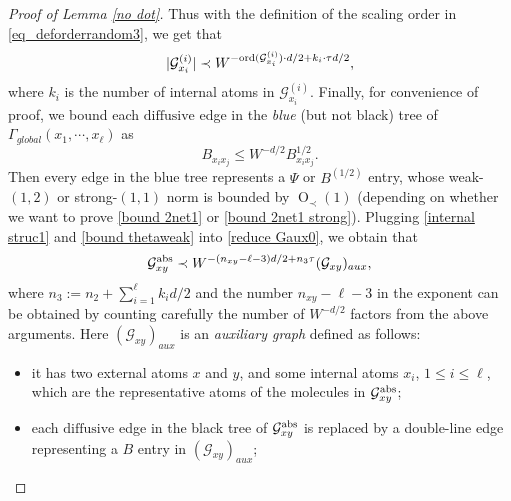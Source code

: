 \documentclass{article}
\newcommand{\1}{\mathds{1}}
\numberwithin{equation}{section}
\newcommand{\ord}{{\rm{ord}}}
\newcommand{\be}{\begin{equation}}
\newcommand{\ee}{\end{equation}}
\renewcommand{\cal}{\mathcal}
\renewcommand{\leq}{\leqslant}
\renewcommand{\le}{\leq}
\newcommand{\dashed}{\text{diffusive}}
\newcommand{\abs}{{\rm abs}}%
\DeclareMathOperator{\OO}{O}
\theoremstyle{plain} %
\theoremstyle{remark}
\begin{document}
\begin{proof} [Proof of Lemma \ref{no dot}]
Thus with the definition of the scaling order in \eqref{eq_deforderrandom3}, we get that
\begin{align}\label{internal struc1}
|\cal G_{x_i}^{(i)}|\prec W^{-\ord(\cal G^{(i)}_{x_i}) \cdot d/2 + k_{i}\cdot \tau d/2 }, 
\end{align} 
where $k_i$ is the number of internal atoms in $\cal G_{x_i}^{(i)}$. Finally, for convenience of proof, we bound each $\dashed$ edge in the \emph{blue} (but not black) tree of $\Gamma_{global}(x_1, \cdots, x_\ell)$ as
\be\label{bound thetaweak} B_{x_i x_j}\le W^{-d/2}B_{x_i x_j} ^{1/2}.\ee
Then every edge in the blue tree represents a $\Psi$ or $B^{(1/2)}$ entry, whose weak-$(1,2)$ or strong-$(1,1)$ norm is bounded by $\OO_\prec(1)$ (depending on whether we want to prove \eqref{bound 2net1} or \eqref{bound 2net1 strong}).
Plugging \eqref{internal struc1} and \eqref{bound thetaweak} into \eqref{reduce Gaux0}, we obtain that
\be\label{bound G aux}
 \cal G_{xy}^{\abs} \prec W^{- (n_{xy}-\ell -3) d/2 + n_3\tau} (\cal G_{xy})_{aux},
\ee
where $n_3:=n_2+\sum_{i=1}^\ell k_i d/2$ and the number $n_{xy}-\ell -3$ in the exponent can be obtained by counting carefully the number of $W^{-d/2}$ factors from the above arguments. %
Here $(\cal G_{xy})_{aux}$ is an \emph{auxiliary graph} defined as follows: 
 \begin{itemize}
\item it has two external atoms $x$ and $y$, and some internal atoms $x_i$, $1\le i \le \ell$, which are the representative atoms of the molecules in $\cal G_{xy}^{\abs}$; 

\item each $\dashed$ edge in the black tree of $\cal G_{xy}^{\abs}$ is replaced by a double-line edge representing a $B$ entry in $(\cal G_{xy})_{aux}$; 


\end{itemize}
\end{proof}
\end{document}
